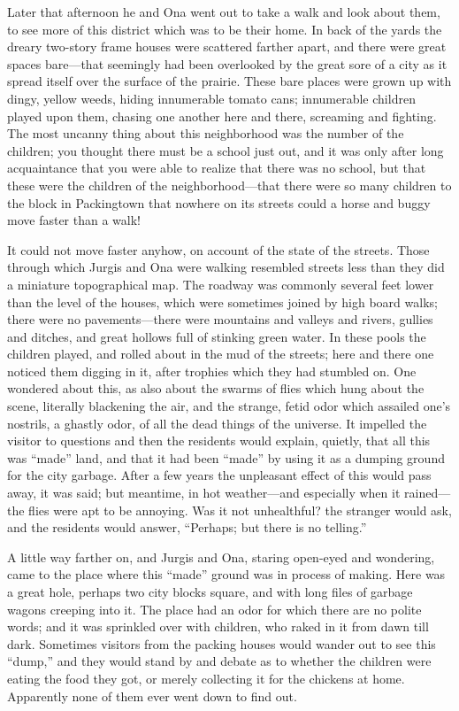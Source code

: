 \documentclass[
]{book}
\theoremstyle{definition}
\theoremstyle{definition}
\theoremstyle{definition}
\theoremstyle{definition}
\theoremstyle{remark}
\begin{document}
Later that afternoon he and Ona went out to take a walk and look about them, to see more of this district which was to be their home. In back of the yards the dreary two-story frame houses were scattered farther apart, and there were great spaces bare---that seemingly had been overlooked by the great sore of a city as it spread itself over the surface of the prairie. These bare places were grown up with dingy, yellow weeds, hiding innumerable tomato cans; innumerable children played upon them, chasing one another here and there, screaming and fighting. The most uncanny thing about this neighborhood was the number of the children; you thought there must be a school just out, and it was only after long acquaintance that you were able to realize that there was no school, but that these were the children of the neighborhood---that there were so many children to the block in Packingtown that nowhere on its streets could a horse and buggy move faster than a walk!

It could not move faster anyhow, on account of the state of the streets. Those through which Jurgis and Ona were walking resembled streets less than they did a miniature topographical map. The roadway was commonly several feet lower than the level of the houses, which were sometimes joined by high board walks; there were no pavements---there were mountains and valleys and rivers, gullies and ditches, and great hollows full of stinking green water. In these pools the children played, and rolled about in the mud of the streets; here and there one noticed them digging in it, after trophies which they had stumbled on. One wondered about this, as also about the swarms of flies which hung about the scene, literally blackening the air, and the strange, fetid odor which assailed one's nostrils, a ghastly odor, of all the dead things of the universe. It impelled the visitor to questions and then the residents would explain, quietly, that all this was ``made'' land, and that it had been ``made'' by using it as a dumping ground for the city garbage. After a few years the unpleasant effect of this would pass away, it was said; but meantime, in hot weather---and especially when it rained---the flies were apt to be annoying. Was it not unhealthful? the stranger would ask, and the residents would answer, ``Perhaps; but there is no telling.''

A little way farther on, and Jurgis and Ona, staring open-eyed and wondering, came to the place where this ``made'' ground was in process of making. Here was a great hole, perhaps two city blocks square, and with long files of garbage wagons creeping into it. The place had an odor for which there are no polite words; and it was sprinkled over with children, who raked in it from dawn till dark. Sometimes visitors from the packing houses would wander out to see this ``dump,'' and they would stand by and debate as to whether the children were eating the food they got, or merely collecting it for the chickens at home. Apparently none of them ever went down to find out.
\end{document}
